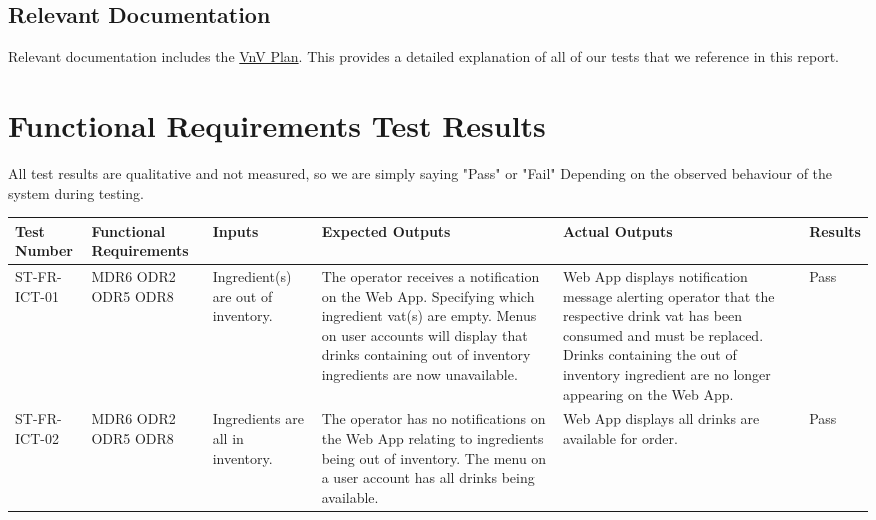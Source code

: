 \documentclass[12pt, titlepage]{article}
\begin{document}
\subsection{Relevant Documentation}
Relevant documentation includes the \href{https://github.com/purefisher/Smart-Serve/blob/main/docs/VnVPlan/VnVPlan.pdf}{VnV Plan}. This provides a detailed explanation of all of our tests that we reference in this report.

\newpage
\section{Functional Requirements Test Results}
All test results are qualitative and not measured, so we are simply saying "Pass" or "Fail" Depending on the observed behaviour of the system during testing.
    \begin{rotate}{}
    \begin{landscape}
        \begin{table}
           \begin{tabular}{|p{2.75cm}|p{2.5cm}|p{4cm}|p{4.75cm}|p{4.25cm}|p{1.5cm}|}
            \hline
            Test Number & Functional \newline Requirements & Inputs & Expected Outputs & Actual Outputs & Results  \\ [0.5ex]
            \hline\hline
            ST-FR-ICT-01 & MDR6 \newline ODR2 \newline ODR5 \newline ODR8 & Ingredient(s) are out of inventory. & The operator receives a notification on the Web App. Specifying which ingredient vat(s) are empty. Menus on user accounts will display that drinks containing out of inventory ingredients are now unavailable. & Web App displays notification message alerting operator that the respective drink vat has been consumed and must be replaced. Drinks containing the out of inventory ingredient are no longer appearing on the Web App. & Pass \\
            \hline
            ST-FR-ICT-02 & MDR6 \newline ODR2 \newline ODR5 \newline ODR8  & Ingredients are all in inventory. & The operator has no notifications on the Web App relating to ingredients being out of inventory. The menu on a user account has all drinks being available. & Web App displays all drinks are available for order. & Pass \\

\end{tabular}
\end{table}
\end{landscape}
\end{rotate}
\end{document}

